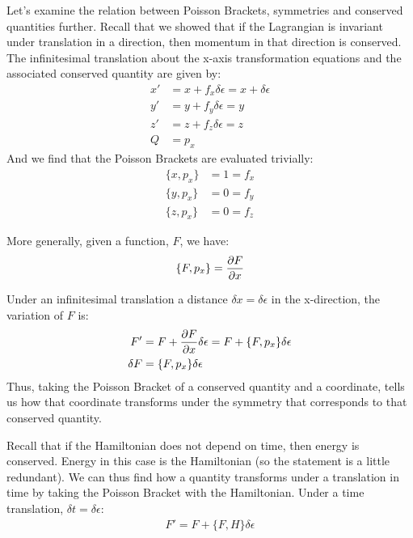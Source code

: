 Let's examine the relation between Poisson Brackets, symmetries and conserved quantities further. Recall that we showed that if the Lagrangian is invariant under translation in a direction, then momentum in that direction is conserved. The infinitesimal translation about the x-axis transformation equations and the associated conserved quantity are given by:
\begin{align}
x'&=x+f_x\delta\epsilon =x+\delta\epsilon\nonumber\\
y'&=y+f_y\delta\epsilon =y\nonumber\\
z'&=z+f_z\delta\epsilon =z\nonumber\\
Q &=p_x
\end{align}
And we find that the Poisson Brackets are evaluated trivially:
\begin{align}
\{x,p_x\}&=1=f_x\nonumber\\
\{y,p_x\}&=0=f_y\nonumber\\
\{z,p_x\}&=0=f_z
\end{align}

More generally, given a function, $F$, we have:
\begin{align}
\{F,p_x\}=\frac{\partial F}{\partial x}
\end{align}

Under an infinitesimal translation a distance $\delta x=\delta\epsilon$ in the x-direction, the variation of $F$ is:
\begin{align}
F'&=F+\frac{\partial F}{\partial x}\delta\epsilon =F+\{F,p_x\}\delta\epsilon\nonumber\\
\delta F&=\{F,p_x\}\delta\epsilon
\end{align}
Thus, taking the Poisson Bracket of a conserved quantity and a coordinate, tells us how that coordinate transforms under the symmetry that corresponds to that conserved quantity.

Recall that if the Hamiltonian does not depend on time, then energy is conserved. Energy in this case is the Hamiltonian (so the statement is a little redundant). We can thus find how a quantity transforms under a translation in time by taking the Poisson Bracket with the Hamiltonian. Under a time translation, $\delta t = \delta \epsilon$:
\begin{align}
F'=F+\{F,H\}\delta\epsilon
\end{align}

